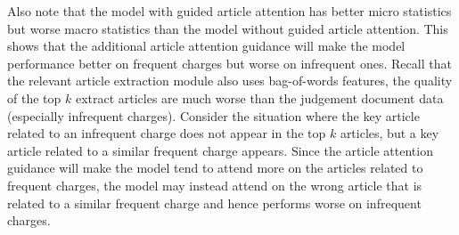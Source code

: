 Also note that the model with guided article attention has better micro statistics but worse macro statistics than the model without guided article attention. This shows that the additional article attention guidance will make the model performance better on frequent charges but worse on infrequent ones. Recall that the relevant article extraction module also uses bag-of-words features, the quality of the top $k$ extract articles are much worse than the judgement document data (especially infrequent charges). Consider the situation where the key article related to an infrequent charge does not appear in the top $k$ articles, but a key article related to a similar frequent charge appears. Since the article attention guidance will make the model tend to attend more on the articles related to frequent charges, the model may instead attend on the wrong article that is related to a similar frequent charge and hence performs worse on infrequent charges.